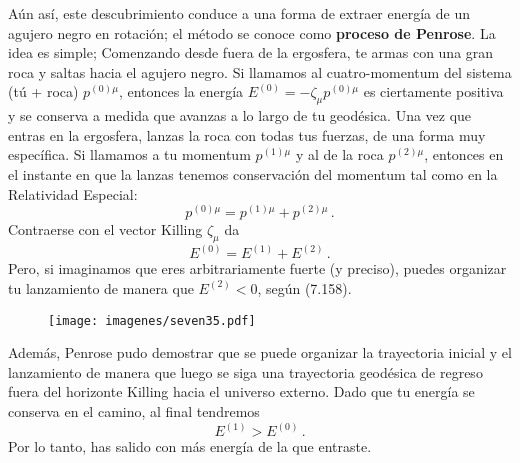 \documentclass[11pt,b5paper,openany,twoside]{book}
\begin{document}
Aún así, este descubrimiento conduce a una forma de extraer energía de un agujero negro en rotación; el método se conoce como {\bf proceso de Penrose}.
La idea es simple; Comenzando desde fuera de la ergosfera, te armas con una gran roca y saltas hacia el agujero negro.
Si llamamos al cuatro-momentum del sistema (tú + roca) $p^{(0)\mu}$, entonces la energía $E^{(0)}=-\zeta_\mu p^{(0)\mu}$ es ciertamente positiva y se conserva a medida que avanzas a lo largo de tu geodésica.
Una vez que entras en la ergosfera, lanzas la roca con todas tus fuerzas, de una forma muy específica.
Si llamamos a tu momentum $p^{(1)\mu}$ y al de la roca $p^{(2)\mu}$, entonces en el instante en que la lanzas tenemos conservación del momentum tal como en la Relatividad Especial:
\begin{equation}
p^{(0)\mu}=p^{(1)\mu}+p^{(2)\mu}\,.\label{7.139}
\end{equation}
Contraerse con el vector Killing $\zeta_\mu$ da
\begin{equation}
E^{(0)}=E^{(1)}+E^{(2)}\,.\label{7.140}
\end{equation}
Pero, si imaginamos que eres arbitrariamente fuerte (y preciso), puedes organizar tu lanzamiento de manera que $E^{(2)}<0$, según (7.158).

\begin{figure}[h]
\centering
\texttt{[image: imagenes/seven35.pdf]}
\end{figure}
Además, Penrose pudo demostrar que se puede organizar la trayectoria inicial y el lanzamiento de manera que luego se siga una trayectoria geodésica de regreso fuera del horizonte Killing hacia el universo externo.
Dado que tu energía se conserva en el camino, al final tendremos
\begin{equation}
E^{(1)}>E^{(0)}\,.\label{7.141}
\end{equation}
Por lo tanto, has salido con más energía de la que entraste.
\end{document}
